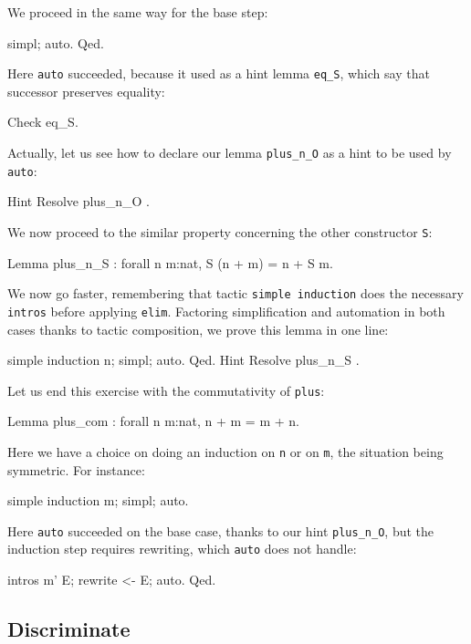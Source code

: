 \documentclass[11pt,a4paper]{book}
\begin{document}
We proceed in the same way for the base step:
\begin{coq_example}
simpl; auto.
Qed.
\end{coq_example}

Here \verb:auto: succeeded, because it used as a hint lemma \verb:eq_S:,
which say that successor preserves equality:
\begin{coq_example}
Check eq_S.
\end{coq_example}

Actually, let us see how to declare our lemma \verb:plus_n_O: as a hint
to be used by \verb:auto::
\begin{coq_example}
Hint Resolve plus_n_O .
\end{coq_example}

We now proceed to the similar property concerning the other constructor
\verb:S::
\begin{coq_example}
Lemma plus_n_S : forall n m:nat, S (n + m) = n + S m.
\end{coq_example}

We now go faster, remembering that tactic \verb:simple induction: does the
necessary \verb:intros: before applying \verb:elim:. Factoring simplification
and automation in both cases thanks to tactic composition, we prove this
lemma in one line:
\begin{coq_example}
simple induction n; simpl; auto.
Qed.
Hint Resolve plus_n_S .
\end{coq_example}

Let us end this exercise with the commutativity of \verb:plus::

\begin{coq_example}
Lemma plus_com : forall n m:nat, n + m = m + n.
\end{coq_example}

Here we have a choice on doing an induction on \verb:n: or on \verb:m:, the
situation being symmetric. For instance:
\begin{coq_example}
simple induction m; simpl; auto.
\end{coq_example}

Here \verb:auto: succeeded on the base case, thanks to our hint
\verb:plus_n_O:, but the induction step requires rewriting, which
\verb:auto: does not handle:

\begin{coq_example}
intros m' E; rewrite <- E; auto.
Qed.
\end{coq_example}

\subsection{Discriminate}
\end{document}
